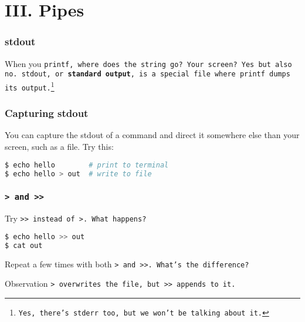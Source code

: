 \section{III. Pipes}
\begin{frame}
\frametitle{stdout}
When you \tt{printf}, where does the string go?
\newline \newline
Your screen? Yes but also no.
\newline \newline
\tt{stdout}, or \textbf{standard output}, is a special file where \tt{printf}
dumps its output.\footnote{Yes, there's \tt{stderr} too, but we won't be talking
about it.}
\end{frame}

\begin{frame}[fragile]
\frametitle{Capturing stdout}
You can capture the stdout of a command and direct it somewhere else than your
screen, such as a file.
Try this:
\begin{lstlisting}[language=bash]
$ echo hello        # print to terminal
$ echo hello > out  # write to file
\end{lstlisting}
\begin{figure}
    \centering
\end{figure}
\end{frame}

\begin{frame}[fragile]
\frametitle{\tt{>} and \tt{>>}}
Try \tt{>>} instead of \tt{>}. What happens?
\begin{lstlisting}[language=bash]
$ echo hello >> out
$ cat out
\end{lstlisting}
Repeat a few times with both \tt{>} and \tt{>>}. What's the difference?
\pause
\begin{block}{Observation}
    \tt{>} overwrites the file, but \tt{>>} appends to it.
\end{block}
\end{frame}

